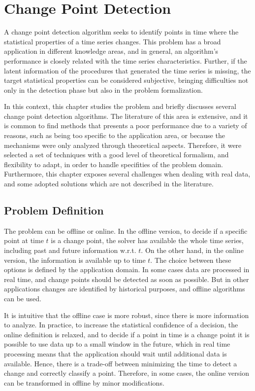 \chapter{Change Point Detection} 

A change point detection algorithm seeks to identify points in time where the statistical properties of a time series changes. This problem has a broad application in different knowledge areas, and in general, an algorithm's performance is closely related with the time series characteristics. Further, if the latent information of the procedures that generated the time series is missing, the target statistical properties can be considered subjective, bringing difficulties not only in the detection phase but also in the problem formalization.

In this context, this chapter studies the problem and briefly discusses several change point detection algorithms. The literature of this area is extensive, and it is common to find methods that presents a poor performance due to a variety of reasons, such as being too specific to the application area, or because the mechanisms were only analyzed through theoretical aspects. Therefore, it were selected a set of techniques with a good level of theoretical formalism, and flexibility to adapt, in order to handle specifities of the problem domain. Furthermore, this chapter exposes several challenges when dealing with real data, and some adopted solutions which are not described in the literature.

\section{Problem Definition}

The problem can be offline or online. In the offline version, to decide if a specific point at time $t$ is a change point, the solver has available the whole time series, including past and future information w.r.t. $t$. On the other hand, in the online version, the information is available up to time $t$. The choice between these options is defined by the application domain. In some cases data are processed in real time, and change points should be detected as soon as possible. But in other applications changes are identified by historical purposes, and offline algorithms can be used. 

It is intuitive that the offline case is more robust, since there is more information to analyze. In practice, to increase the statistical confidence of a decision, the online definition is relaxed, and to decide if a point in time is a change point it is possible to use data up to a small window in the future, which in real time processing means that the application should wait until additional data is available. Hence, there is a trade-off between minimizing the time to detect a change and correctly classify a point. Therefore, in some cases, the online version can be transformed in offline by minor modifications. 

